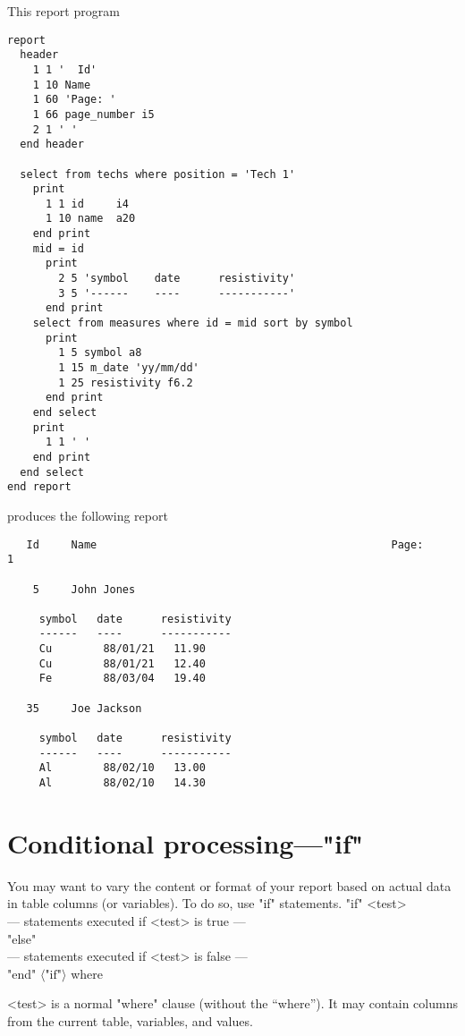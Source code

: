 \documentclass[11pt,a4paper]{report}
\def\opt#1{$\langle \mbox{#1} \rangle$}
\def\I{\index}
\begin{document}
\demobreak
This report program
\begin{verbatim}
report
  header
    1 1 '  Id'
    1 10 Name
    1 60 'Page: '
    1 66 page_number i5
    2 1 ' '
  end header
 
  select from techs where position = 'Tech 1'
    print
      1 1 id     i4
      1 10 name  a20
    end print
    mid = id
      print
        2 5 'symbol    date      resistivity'
        3 5 '------    ----      -----------'
      end print
    select from measures where id = mid sort by symbol
      print
        1 5 symbol a8
        1 15 m_date 'yy/mm/dd'
        1 25 resistivity f6.2
      end print
    end select
    print
      1 1 ' '
    end print
  end select
end report
\end{verbatim}
\demobreak
produces the following report
 
\begin{verbatim}
   Id     Name                                              Page:     1
 
    5     John Jones
 
     symbol   date      resistivity
     ------   ----      -----------
     Cu        88/01/21   11.90
     Cu        88/01/21   12.40
     Fe        88/03/04   19.40
 
   35     Joe Jackson
 
     symbol   date      resistivity
     ------   ----      -----------
     Al        88/02/10   13.00
     Al        88/02/10   14.30
\end{verbatim}
 
 
 
\section{Conditional processing---"if"}
%
\I{if statement}
\I{else statement}
You may want to vary the content or format of your report
based on actual data in table columns (or variables).
To do so, use "if" statements.
"if" <test>\\
  --- statements executed if <test> is true ---\\
  "else"\\
  --- statements executed if <test> is false ---\\
  "end" \opt{"if"}
where
\begin{List}
\item[<test>] is a normal "where" clause (without the
``where'').  It may contain columns from the current table,
variables, and values.
\end{List}
 
\end{document}
